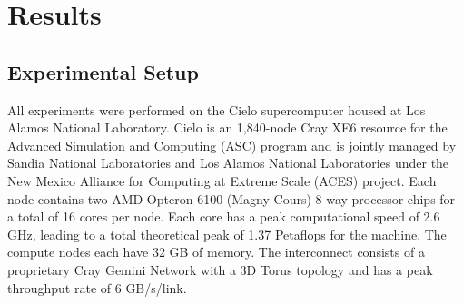 \section{Results}
\label{sec:Results}


\subsection{Experimental Setup}

All experiments were performed on the Cielo supercomputer housed at Los Alamos
National Laboratory.  Cielo is an 1,840-node Cray XE6 resource for the Advanced
Simulation and Computing (ASC) program and is jointly managed by Sandia National 
Laboratories and Los Alamos National Laboratories under the New Mexico
Alliance for Computing at Extreme Scale (ACES) project.  Each node contains
two AMD Opteron 6100 (Magny-Cours) 8-way processor chips for a total of 16 cores
per node.  Each core has a peak computational speed of 2.6 GHz, leading to a total 
theoretical peak of 1.37 Petaflops for the machine. The compute nodes each
have 32 GB of memory.  The interconnect consists of a proprietary Cray Gemini
Network with a 3D Torus topology and has a peak throughput rate of 6 GB/s/link. 

